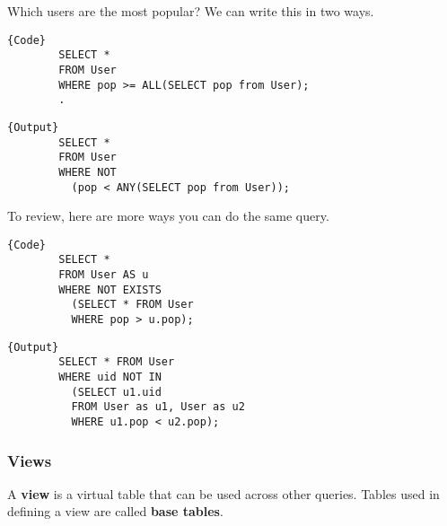     \begin{example}
      Which users are the most popular? We can write this in two ways. 

      \noindent\begin{minipage}{.5\textwidth}
      \begin{lstlisting}[]{Code}
        SELECT * 
        FROM User 
        WHERE pop >= ALL(SELECT pop from User); 
        .
      \end{lstlisting}
      \end{minipage}
      \hfill
      \begin{minipage}{.49\textwidth}
      \begin{lstlisting}[]{Output}
        SELECT * 
        FROM User 
        WHERE NOT 
          (pop < ANY(SELECT pop from User)); 
      \end{lstlisting}
      \end{minipage}

      To review, here are more ways you can do the same query. 

      \noindent\begin{minipage}{.5\textwidth}
      \begin{lstlisting}[]{Code}
        SELECT * 
        FROM User AS u 
        WHERE NOT EXISTS  
          (SELECT * FROM User
          WHERE pop > u.pop); 
      \end{lstlisting}
      \end{minipage}
      \hfill
      \begin{minipage}{.49\textwidth}
      \begin{lstlisting}[]{Output}
        SELECT * FROM User 
        WHERE uid NOT IN 
          (SELECT u1.uid
          FROM User as u1, User as u2 
          WHERE u1.pop < u2.pop); 
      \end{lstlisting}
      \end{minipage}
    \end{example}
  
  \subsubsection{Views}

    \begin{definition}[View]
      A \textbf{view} is a virtual table that can be used across other queries. Tables used in defining a view are called \textbf{base tables}. 
    \end{definition}

